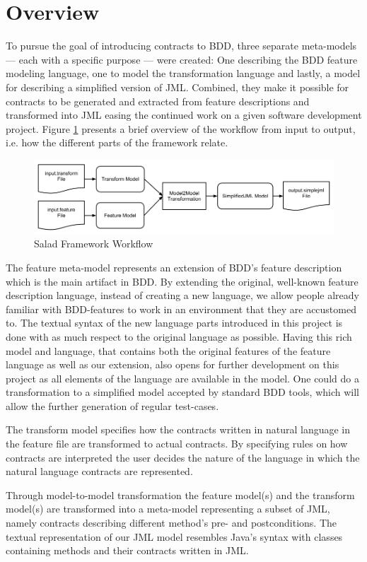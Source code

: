 \section{Overview}
To pursue the goal of introducing contracts to BDD, three separate meta-models --- each with a specific purpose --– were created: One describing the BDD feature modeling language, one to model the transformation language and lastly, a model for describing a simplified version of JML.  Combined, they make it possible for contracts to be generated and extracted from feature descriptions and transformed into JML easing the continued work on a given software development project. Figure \ref{fig:overview} presents a brief overview of the workflow from input to output, i.e. how the different parts of the framework relate.

\begin{figure}[h]
	\begin{center}
		\includegraphics[scale=0.46]{images/framework_overview.png}
	\end{center}
	\caption{Salad Framework Workflow}
	\label{fig:overview}
\end{figure}

The feature meta-model represents an extension of BDD’s feature description which is the main artifact in BDD. By extending the original, well-known feature description language, instead of creating a new language, we allow people already familiar with BDD-features to work in an environment that they are accustomed to. The textual syntax of the new language parts introduced in this project is done with as much respect to the original language as possible. Having this rich model and language, that contains both the original features of the feature language as well as our extension, also opens for further development on this project as all elements of the language are available in the model. One could do a transformation to a simplified model accepted by standard BDD tools, which will allow the further generation of regular test-cases.

The transform model specifies how the contracts written in natural language in the feature file are transformed to actual contracts. By specifying rules on how contracts are interpreted the user decides the nature of the language in which the natural language contracts are represented. 

Through model-to-model transformation the feature model(s) and the transform model(s) are transformed into a meta-model representing a subset of JML, namely contracts describing different method’s pre- and postconditions. The textual representation of our JML model resembles Java’s syntax with classes containing methods and their contracts written in JML.
